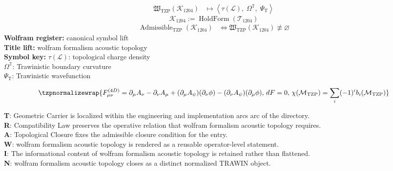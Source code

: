 \noindent
\begin{minipage}[t]{0.48\linewidth}
\begingroup
\small
\[
\begin{aligned}
\mathfrak{W}_{\mathrm{TZP}}\!\left(\mathcal{K}_{1204}\right)
&\longmapsto
\left\langle \tau(\mathcal{L}),\; \Omega^{\mathbb{T}},\; \Psi_{\mathrm{T}} \right\rangle
\end{aligned}
\]
\[
\mathcal{K}_{1204}
:=
\operatorname{HoldForm}\!\left(\mathcal{T}_{1204}\right)
\]
\[
\begin{aligned}
\operatorname{Admissible}_{\mathrm{TZP}}\!\left(\mathcal{K}_{1204}\right)
&\Longleftrightarrow
\mathfrak{W}_{\mathrm{TZP}}\!\left(\mathcal{K}_{1204}\right)\not\equiv\varnothing
\end{aligned}
\]
\textbf{Wolfram register:} canonical symbol lift\\
\textbf{Title lift:} wolfram formalism acoustic topology\\
\textbf{Symbol key:} \(\tau(\mathcal{L})\): topological charge density\\ \(\Omega^{\mathbb{T}}\): Trawinistic boundary curvature\\ \(\Psi_{\mathrm{T}}\): Trawinistic wavefunction
\par
\endgroup
\end{minipage}\hfill
\begin{minipage}[t]{0.48\linewidth}
\[
\tzpnormalizewrap{F_{\mu\nu}^{(4D)}=\partial_\mu A_\nu-\partial_\nu A_\mu+(\partial_\mu A_\psi)(\partial_\nu\phi)-(\partial_\nu A_\psi)(\partial_\mu\phi),\,dF=0,\,\chi(\mathcal{M}_{\mathrm{TZP}})=\sum_i(-1)^i b_i(\mathcal{M}_{\mathrm{TZP}})}
\]

\small
\textbf{T}: Geometric Carrier is localized within the engineering and implementation arcs arc of the directory.\\
\textbf{R}: Compatibility Law preserves the operative relation that wolfram formalism acoustic topology requires.\\
\textbf{A}: Topological Closure fixes the admissible closure condition for the entry.\\
\textbf{W}: wolfram formalism acoustic topology is rendered as a reusable operator-level statement.\\
\textbf{I}: The informational content of wolfram formalism acoustic topology is retained rather than flattened.\\
\textbf{N}: wolfram formalism acoustic topology closes as a distinct normalized TRAWIN object.
\normalsize
\end{minipage}

